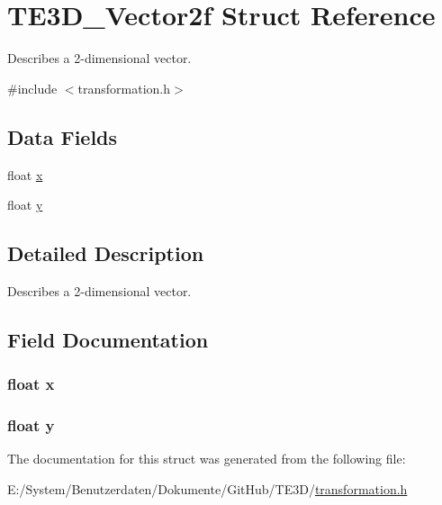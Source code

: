 \hypertarget{struct_t_e3_d___vector2f}{\section{T\-E3\-D\-\_\-\-Vector2f Struct Reference}
\label{struct_t_e3_d___vector2f}
}


Describes a 2-\/dimensional vector.  




{\ttfamily \#include $<$transformation.\-h$>$}

\subsection*{Data Fields}
\begin{DoxyCompactItemize}
\item 
float \hyperlink{struct_t_e3_d___vector2f_ad0da36b2558901e21e7a30f6c227a45e}{x}
\item 
float \hyperlink{struct_t_e3_d___vector2f_aa4f0d3eebc3c443f9be81bf48561a217}{y}
\end{DoxyCompactItemize}


\subsection{Detailed Description}
Describes a 2-\/dimensional vector. 

\subsection{Field Documentation}
\hypertarget{struct_t_e3_d___vector2f_ad0da36b2558901e21e7a30f6c227a45e}{
\subsubsection[{x}]{\setlength{\rightskip}{0pt plus 5cm}float x}}\label{struct_t_e3_d___vector2f_ad0da36b2558901e21e7a30f6c227a45e}
\hypertarget{struct_t_e3_d___vector2f_aa4f0d3eebc3c443f9be81bf48561a217}{
\subsubsection[{y}]{\setlength{\rightskip}{0pt plus 5cm}float y}}\label{struct_t_e3_d___vector2f_aa4f0d3eebc3c443f9be81bf48561a217}


The documentation for this struct was generated from the following file\-:\begin{DoxyCompactItemize}
\item 
E\-:/\-System/\-Benutzerdaten/\-Dokumente/\-Git\-Hub/\-T\-E3\-D/\hyperlink{transformation_8h}{transformation.\-h}\end{DoxyCompactItemize}
